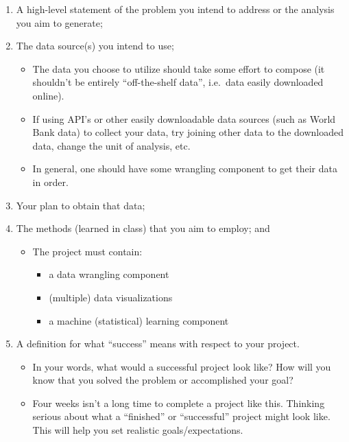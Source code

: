 \documentclass[
  12pt,
]{article}
\providecommand{\tightlist}{%
  \setlength{\itemsep}{0pt}\setlength{\parskip}{0pt}}
\begin{document}
\begin{enumerate}
\def\labelenumi{\arabic{enumi}.}
\tightlist
\item
  A high-level statement of the problem you intend to address or the
  analysis you aim to generate;
\item
  The data source(s) you intend to use;

  \begin{itemize}
  \tightlist
  \item
    The data you choose to utilize should take some effort to compose
    (it shouldn't be entirely ``off-the-shelf data'', i.e.~data easily
    downloaded online).
  \item
    If using API's or other easily downloadable data sources (such as
    World Bank data) to collect your data, try joining other data to the
    downloaded data, change the unit of analysis, etc.
  \item
    In general, one should have some wrangling component to get their
    data in order.
  \end{itemize}
\item
  Your plan to obtain that data;
\item
  The methods (learned in class) that you aim to employ; and

  \begin{itemize}
  \tightlist
  \item
    The project must contain:

    \begin{itemize}
    \tightlist
    \item
      a data wrangling component
    \item
      (multiple) data visualizations
    \item
      a machine (statistical) learning component
    \end{itemize}
  \end{itemize}
\item
  A definition for what ``success'' means with respect to your project.

  \begin{itemize}
  \tightlist
  \item
    In your words, what would a successful project look like? How will
    you know that you solved the problem or accomplished your goal?
  \item
    Four weeks isn't a long time to complete a project like this.
    Thinking serious about what a ``finished'' or ``successful'' project
    might look like. This will help you set realistic
    goals/expectations.
  \end{itemize}
\end{enumerate}
\end{document}
